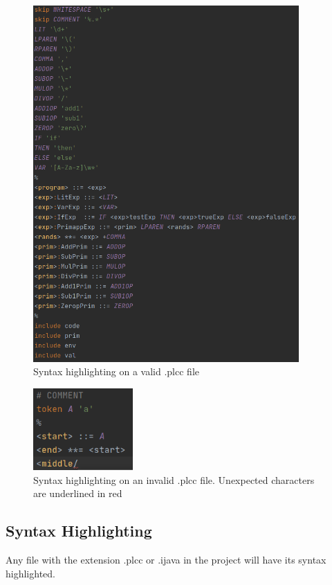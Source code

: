 \documentclass[conference, letterpaper]{IEEEtran}
\begin{document}
\begin{figure}[!t]
    \centering
    \includegraphics[width=4in]{syntax.png}
    \caption{Syntax highlighting on a valid .plcc file}
    \label{fig:syntax}
\end{figure}
\begin{figure}[!t]
    \centering
    \includegraphics[width=1.5in]{syntax_invalid.png}
    \caption{Syntax highlighting on an invalid  .plcc file. Unexpected characters are underlined in red}
    \label{fig:syntax_invalid}
\end{figure}

\subsection{Syntax Highlighting}\label{subsec:new-.plcc-file-syntax-highlighting}
Any file with the extension .plcc or .ijava in the project will have its syntax highlighted.
\end{document}
